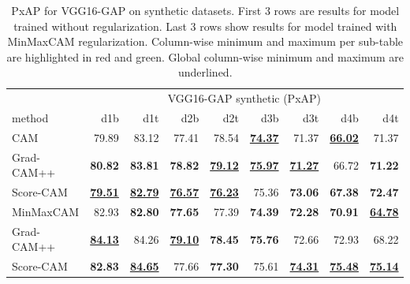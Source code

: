 \begin{table}[H]
\centering
\begin{tabular}{lrrrrrrrr}
\toprule
 & \multicolumn{8}{c}{VGG16-GAP synthetic (PxAP)} \\
method & d1b & d1t & d2b & d2t & d3b & d3t & d4b & d4t \\
\cmidrule(lr){1-1} \cmidrule(lr){2-9} 
CAM & 79.89 & 83.12 & 77.41 & 78.54 & \color{purple} \bfseries \underline{74.37} & 71.37 & \color{purple} \bfseries \underline{66.02} & 71.37 \\
Grad-CAM++ & \color{teal} \bfseries 80.82 & \color{teal} \bfseries 83.81 & \color{teal} \bfseries 78.82 & \color{teal} \bfseries \underline{79.12} & \color{teal} \bfseries \underline{75.97} & \color{purple} \bfseries \underline{71.27} & 66.72 & \color{purple} \bfseries 71.22 \\
Score-CAM & \color{purple} \bfseries \underline{79.51} & \color{purple} \bfseries \underline{82.79} & \color{purple} \bfseries \underline{76.57} & \color{purple} \bfseries \underline{76.23} & 75.36 & \color{teal} \bfseries 73.06 & \color{teal} \bfseries 67.38 & \color{teal} \bfseries 72.47 \\
\cmidrule(lr){1-1} \cmidrule(lr){2-9} 
MinMaxCAM & 82.93 & \color{purple} \bfseries 82.80 & \color{purple} \bfseries 77.65 & 77.39 & \color{purple} \bfseries 74.39 & \color{purple} \bfseries 72.28 & \color{purple} \bfseries 70.91 & \color{purple} \bfseries \underline{64.78} \\
Grad-CAM++ & \color{teal} \bfseries \underline{84.13} & 84.26 & \color{teal} \bfseries \underline{79.10} & \color{teal} \bfseries 78.45 & \color{teal} \bfseries 75.76 & 72.66 & 72.93 & 68.22 \\
Score-CAM & \color{purple} \bfseries 82.83 & \color{teal} \bfseries \underline{84.65} & 77.66 & \color{purple} \bfseries 77.30 & 75.61 & \color{teal} \bfseries \underline{74.31} & \color{teal} \bfseries \underline{75.48} & \color{teal} \bfseries \underline{75.14} \\
\bottomrule
\end{tabular}
\caption[PxAP for VGG16-GAP on synthetic datasets]{PxAP for VGG16-GAP on synthetic datasets. First 3 rows are results for model trained without regularization. Last 3 rows show results for model trained with MinMaxCAM regularization. Column-wise minimum and maximum per sub-table are highlighted in red and green. Global column-wise minimum and maximum are underlined.}
\label{tab:pxap_vgg16_gap_synthetic}
\end{table}

